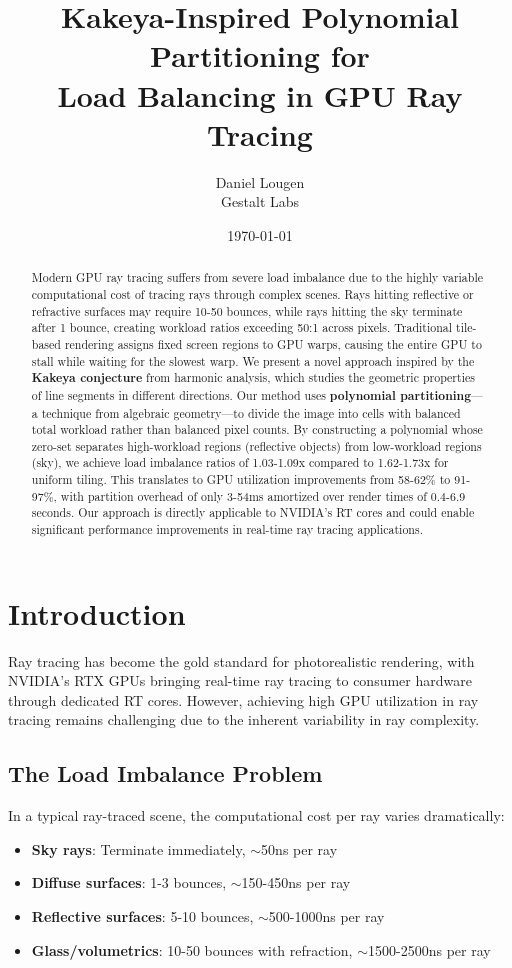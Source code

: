 \documentclass[11pt,a4paper]{article}
\title{Kakeya-Inspired Polynomial Partitioning for \\Load Balancing in GPU Ray Tracing}
\author{
  Daniel Lougen \\
  Gestalt Labs
}
\date{\today}
\begin{document}
\maketitle

\begin{abstract}
Modern GPU ray tracing suffers from severe load imbalance due to the highly variable computational cost of tracing rays through complex scenes. Rays hitting reflective or refractive surfaces may require 10-50 bounces, while rays hitting the sky terminate after 1 bounce, creating workload ratios exceeding 50:1 across pixels. Traditional tile-based rendering assigns fixed screen regions to GPU warps, causing the entire GPU to stall while waiting for the slowest warp. We present a novel approach inspired by the \textbf{Kakeya conjecture} from harmonic analysis, which studies the geometric properties of line segments in different directions. Our method uses \textbf{polynomial partitioning}—a technique from algebraic geometry—to divide the image into cells with balanced total workload rather than balanced pixel counts. By constructing a polynomial whose zero-set separates high-workload regions (reflective objects) from low-workload regions (sky), we achieve load imbalance ratios of 1.03-1.09x compared to 1.62-1.73x for uniform tiling. This translates to GPU utilization improvements from 58-62\% to 91-97\%, with partition overhead of only 3-54ms amortized over render times of 0.4-6.9 seconds. Our approach is directly applicable to NVIDIA's RT cores and could enable significant performance improvements in real-time ray tracing applications.
\end{abstract}

\section{Introduction}

Ray tracing has become the gold standard for photorealistic rendering, with NVIDIA's RTX GPUs bringing real-time ray tracing to consumer hardware through dedicated RT cores. However, achieving high GPU utilization in ray tracing remains challenging due to the inherent variability in ray complexity.

\subsection{The Load Imbalance Problem}

In a typical ray-traced scene, the computational cost per ray varies dramatically:
\begin{itemize}
    \item \textbf{Sky rays}: Terminate immediately, $\sim$50ns per ray
    \item \textbf{Diffuse surfaces}: 1-3 bounces, $\sim$150-450ns per ray
    \item \textbf{Reflective surfaces}: 5-10 bounces, $\sim$500-1000ns per ray
    \item \textbf{Glass/volumetrics}: 10-50 bounces with refraction, $\sim$1500-2500ns per ray
\end{itemize}
\end{document}
